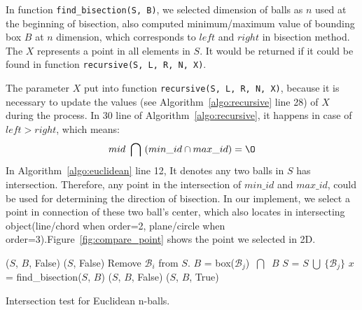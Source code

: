 In function \texttt{find\_bisection(S, B)}, we selected dimension of balls as
$n$ used at the beginning of bisection, also computed minimum/maximum value of
bounding box $B$ at $n$ dimension, which corresponds to $left$ and $right$ in
bisection method. The $X$ represents a point in all elements in $S$. It would be
returned if it could be found in function \texttt{recursive(S, L, R, N, X)}.

The parameter $X$ put into function \texttt{recursive(S, L, R, N, X)}, because
it is necessary to update the values (see Algorithm~\ref{algo:recursive} line
28) of $X$ during the process. In 30 line of Algorithm~\ref{algo:recursive}, it
happens in case of $left > right$, which means:
\begin{equation*}
    mid \  \bigcap \  (min\_id \cap max\_id) = \O
\end{equation*}
In Algorithm~\ref{algo:euclidean} line 12, It denotes any two balls in $S$ has
intersection. Therefore, any point in the intersection of $min\_id$ and
$max\_id$, could be used for determining the direction of bisection. In our
implement, we select a point in connection of these two ball's center, which
also locates in intersecting object(line/chord when order=2, plane/circle when
order=3).Figure~\ref{fig:compare_point} shows the point we selected in 2D.



\begin{algorithm}
\begin{algorithmic}[1]
\Input
\EndInput
\Output
\EndOutput

 
    \State \Return ($S$, $B$, False)
\EndIf
{}
    \State \Return ($S$, False) 
\EndIf
{} 
    \State Remove $\mathcal{B}_i$ from $S$. %
\EndIf
\State $B$ = box($\mathcal{B}_j$) $\ \bigcap\ $ $B$
\State $S$ = $S \ \bigcup \  \{\mathcal{B}_j\}$
\State $x$ = find\_bisection($S$, $B$) 
    \State \Return ($S$, $B$, False)
\Else
    \State \Return ($S$, $B$, True)
\EndIf
\end{algorithmic}
\caption{Intersection test for Euclidean n-balls.}
\label{algo:euclidean}
\end{algorithm}


